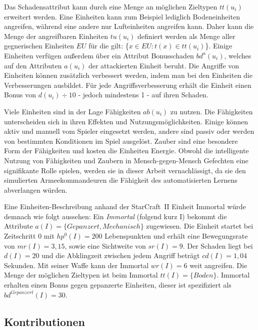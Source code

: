 Das Schadensattribut kann durch eine Menge an möglichen Zieltypen $tt(u_i)$ erweitert werden. Eine Einheiten kann zum Beispiel lediglich Bodeneinheiten angreifen, während eine andere nur Lufteinheiten angreifen kann. Daher kann die Menge der angreifbaren Einheiten $tu(u_i)$ definiert werden als Menge aller gegnerischen Einheiten $EU$ für die gilt: \{$x \in EU : t(x) \in tt(u_i)$\}. Einige Einheiten verfügen außerdem über ein Attribut Bonusschaden $bd^{a}(u_i)$, welches auf den Attributen $a(u_i)$ der attackierten Einheit beruht. Die Angriffe von Einheiten können zusätzlich verbessert werden, indem man bei den Einheiten die Verbesserungen ausbildet. Für jede Angriffsverbesserung erhält die Einheit einen Bonus von $d(u_i) \div 10$ - jedoch mindestens 1 - auf ihren Schaden. 

Viele Einheiten sind in der Lage Fähigkeiten $ab(u_i)$ zu nutzen. Die Fähigkeiten unterscheiden sich in ihren Effekten und Nutzungsmöglichkeiten. Einige können aktiv und manuell vom Spieler eingesetzt werden, andere sind passiv oder werden von bestimmten Konditionen im Spiel ausgelöst. Zauber sind eine besondere Form der Fähigkeiten und kosten die Einheiten Energie. Obwohl die intelligente Nutzung von Fähigkeiten und Zaubern in Mensch-gegen-Mensch Gefechten eine signifikante Rolle spielen, werden sie in dieser Arbeit vernachlässigt, da sie den simulierten Armeekommandeuren die Fähigkeit des automatisierten Lernens abverlangen würden.

Eine Einheiten-Beschreibung anhand der StarCraft~II Einheit Immortal würde demnach wie folgt aussehen:
Ein \textit{Immortal} (folgend kurz I) bekommt die Attribute $a(I) = \{ Gepanzert, Mechanisch \}$ zugewiesen. Die Einheit startet bei Zeitschritt 0 mit $hp^0(I) = 200$ Lebenspunkten und erhält eine Bewegungsrate von $mr(I) = 3,15$, sowie eine Sichtweite von $sr(I) = 9$. Der Schaden liegt bei $d(I) = 20$ und die Abklingzeit zwischen jedem Angriff beträgt $cd(I) = 1,04$ Sekunden. Mit seiner Waffe kann der Immortal $wr(I) = 6$ weit angreifen. Die Menge der möglichen Zieltypen ist beim Immortal $tt(I) = \{ Boden \}$. Immortal erhalten einen Bonus gegen gepanzerte Einheiten, dieser ist spezifiziert als $bd^{Gepanzert}(I) = 30$. 

\subsection{Kontributionen}

